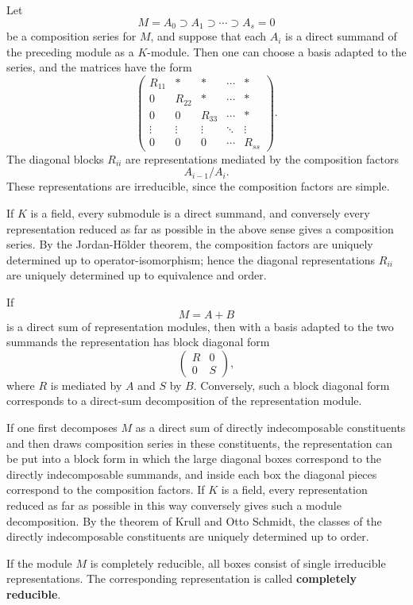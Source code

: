\documentclass[
  11pt,
]{article}
\begin{document}
Let \[
  M=A_0\supset A_1\supset\cdots\supset A_s=0
\] be a composition series for \(M\), and suppose that each \(A_i\) is a
direct summand of the preceding module as a \(K\)-module. Then one can
choose a basis adapted to the series, and the matrices have the form \[
\begin{pmatrix}
R_{11}&*&*&\cdots&*\\
0&R_{22}&*&\cdots&*\\
0&0&R_{33}&\cdots&*\\
\vdots&\vdots&\vdots&\ddots&\vdots\\
0&0&0&\cdots&R_{ss}
\end{pmatrix}.
\] The diagonal blocks \(R_{ii}\) are representations mediated by the
composition factors \[
  A_{i-1}/A_i.
\] These representations are irreducible, since the composition factors
are simple.

If \(K\) is a field, every submodule is a direct summand, and conversely
every representation reduced as far as possible in the above sense gives
a composition series. By the Jordan-Hölder theorem, the composition
factors are uniquely determined up to operator-isomorphism; hence the
diagonal representations \(R_{ii}\) are uniquely determined up to
equivalence and order.

If \[
  M=A+B
\] is a direct sum of representation modules, then with a basis adapted
to the two summands the representation has block diagonal form \[
  \begin{pmatrix} R&0\\0&S\end{pmatrix},
\] where \(R\) is mediated by \(A\) and \(S\) by \(B\). Conversely, such
a block diagonal form corresponds to a direct-sum decomposition of the
representation module.

If one first decomposes \(M\) as a direct sum of directly indecomposable
constituents and then draws composition series in these constituents,
the representation can be put into a block form in which the large
diagonal boxes correspond to the directly indecomposable summands, and
inside each box the diagonal pieces correspond to the composition
factors. If \(K\) is a field, every representation reduced as far as
possible in this way conversely gives such a module decomposition. By
the theorem of Krull and Otto Schmidt, the classes of the directly
indecomposable constituents are uniquely determined up to order.

If the module \(M\) is completely reducible, all boxes consist of single
irreducible representations. The corresponding representation is called
\textbf{completely reducible}.
\end{document}
